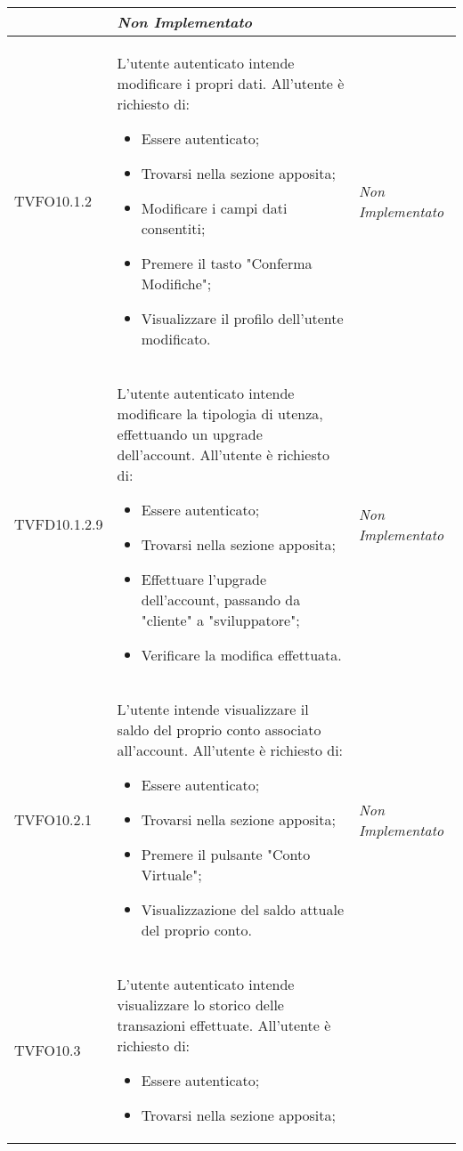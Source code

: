 \begin{longtable}{|>{\centering\arraybackslash}p{2.3cm}|>{\centering\arraybackslash}p{7.5cm} | >{\centering\arraybackslash}p{4cm}|}
\begin{itemize}
		\end{itemize} & \textit{Non Implementato}\\ \hline
		\hypertarget{TVFO10.1.2}{TVFO10.1.2} & L’utente autenticato intende modificare i propri dati. All’utente è richiesto di:
		\begin{itemize}
			\item Essere autenticato;
			\item Trovarsi nella sezione apposita;
			\item Modificare i campi dati consentiti;
			\item Premere il tasto "Conferma Modifiche";
			\item Visualizzare il profilo dell’utente modificato.
		\end{itemize}
		& \textit{Non Implementato}\\ \hline
		\hypertarget{TVFD10.1.2.9}{TVFD10.1.2.9} & L’utente autenticato  intende modificare la tipologia di utenza, effettuando un upgrade dell'account. All’utente è richiesto di:
		\begin{itemize}
			\item Essere autenticato;
			\item Trovarsi nella sezione apposita;
			\item Effettuare l'upgrade dell'account, passando da "cliente" a "sviluppatore";
			\item Verificare la modifica effettuata.
		\end{itemize} & \textit{Non Implementato}\\ \hline
		\hypertarget{TVFO10.2.1}{TVFO10.2.1} & L’utente intende visualizzare il saldo del proprio conto associato all'account. All’utente è richiesto di:
		\begin{itemize}
			\item Essere autenticato;
			\item Trovarsi nella sezione apposita;
			\item Premere il pulsante "Conto Virtuale";
			\item Visualizzazione del saldo attuale del proprio conto.
		\end{itemize} & \textit{Non Implementato}\\ \hline
		\hypertarget{TVFO10.3}{TVFO10.3} & L’utente autenticato intende visualizzare lo storico delle transazioni effettuate. All’utente è richiesto di:
		\begin{itemize}
			\item Essere autenticato;
			\item Trovarsi nella sezione apposita;

\end{itemize}
\end{longtable}
